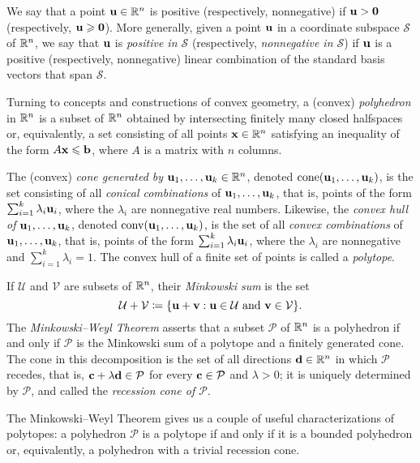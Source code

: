 \documentclass[11pt]{amsart}
\begin{document}
We say that a point $\mathbf{u}\in \mathbb{R}^n$ is positive (respectively, nonnegative) if $\mathbf{u} > \mathbf{0}$ (respectively, $\mathbf{u}\geqslant \mathbf{0}$).
More generally, given a point $\mathbf{u}$ in a coordinate subspace $\mathcal{S}$ of $\mathbb{R}^n$, we say that $\mathbf{u}$ is \emph{positive in $\mathcal{S}$} (respectively, \emph{nonnegative in $\mathcal{S}$}) if $\mathbf{u}$ is a positive (respectively, nonnegative) linear combination of the standard basis vectors that span $\mathcal{S}$.

Turning to concepts and constructions of convex geometry, a (convex) \emph{polyhedron} in $\mathbb{R}^n$ is a subset of $\mathbb{R}^n$ obtained by intersecting finitely many closed halfspaces or, equivalently, a set consisting of all points $\mathbf{x}\in \mathbb{R}^n$ satisfying an inequality of the form $A\mathbf{x}\leqslant \mathbf{b}$, where $A$ is a matrix with $n$ columns.

The (convex) \emph{cone generated by $\mathbf{u}_1,\ldots,\mathbf{u}_k \in \mathbb{R}^n$}, denoted $\operatorname{cone}(\mathbf{u}_1,\ldots,\mathbf{u}_k)$, is the set consisting of all \emph{conical combinations} of $\mathbf{u}_1, \ldots, \mathbf{u}_k$, that is, points of the form $\sum_{i=1}^k \lambda_i \mathbf{u}_i$, where the $\lambda_i$ are nonnegative real numbers.
Likewise, the \emph{convex hull of $\mathbf{u}_1,\ldots,\mathbf{u}_k$}, denoted $\operatorname{conv}(\mathbf{u}_1,\ldots,\mathbf{u}_k)$, is the set of all \emph{convex combinations} of $\mathbf{u}_1, \ldots, \mathbf{u}_k$, that is, points of the form $\sum_{i=1}^k \lambda_i \mathbf{u}_i$, where the $\lambda_i$ are nonnegative and $\sum_{i=1}^k \lambda_i = 1$.
The convex hull of a finite set of points is called a \emph{polytope}.

If $\mathcal{U}$ and $\mathcal{V}$ are subsets of $\mathbb{R}^n$, their \emph{Minkowski sum} is the set
\[\mathcal{U}+\mathcal{V} \coloneqq \{\mathbf{u}+\mathbf{v}: \mathbf{u}\in \mathcal{U}\text{ and }\mathbf{v}\in \mathcal{V}\}.\]
The \emph{Minkowski--Weyl Theorem} asserts that a subset $\mathcal{P}$ of $\mathbb{R}^n$ is a polyhedron if and only if $\mathcal{P}$ is the Minkowski sum of a polytope and a finitely generated cone.
The cone in this decomposition is the set of all directions $\mathbf{d} \in \mathbb{R}^n$ in which $\mathcal{P}$ recedes, that is, $\mathbf{c} + \lambda \mathbf{d} \in \mathcal{P}$ for every $\mathbf{c} \in \mathcal{P}$ and $\lambda > 0$; it is uniquely determined by $\mathcal{P}$, and called the \emph{recession cone of $\mathcal{P}$}.

The Minkowski--Weyl Theorem gives us a couple of useful characterizations of polytopes: a polyhedron $\mathcal{P}$ is a polytope if and only if it is a bounded polyhedron or, equivalently, a polyhedron with a trivial recession cone. 
\end{document}
